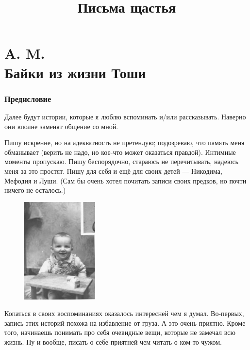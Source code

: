 \documentclass{book}
\begin{document}

\title{Письма щастья}
\author{}
\date{}
\maketitle
\thispagestyle{empty}

\part*{A. M.\\
Байки из жизни Тоши}


\section*{Предисловие}

Далее будут истории, которые я люблю вспоминать и/или рассказывать.
Наверно они вполне заменят общение со мной.

Пишу искренне, но на адекватность не претендую; 
подозреваю, что память меня обманывает (верить не надо, но кое-что может оказаться правдой).
Интимные моменты пропускаю.
Пишу беспорядочно, стараюсь не перечитывать, надеюсь меня за это простят.
Пишу для себя и ещё для своих детей --- Никодима, Мефодия и Луши.
(Сам бы очень хотел почитать записи своих предков, но почти ничего не осталось.)

\begin{figure}
\vskip-4mm
\centering
\includegraphics[width=39mm,angle=0]{pics/tosha-taburetocka}
\end{figure}

Копаться в своих воспоминаниях оказалось интересней чем я думал.
Во-первых, запись этих историй похожа на избавление от груза. 
А это очень приятно.
Кроме того, начинаешь понимать про себя очевидные вещи, которые не замечал всю жизнь.
Ну и вообще, писать о себе приятней чем читать о ком-то чужом.
\end{document}
